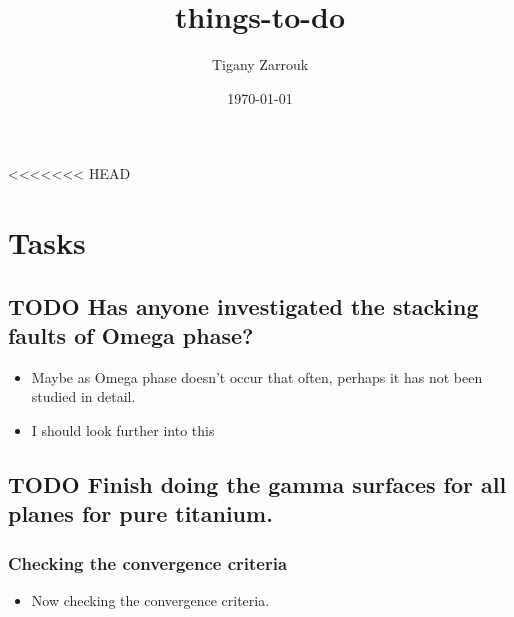 \documentclass[11pt]{article}
\author{Tigany Zarrouk}
\date{\today}
\title{things-to-do}
\begin{document}
\maketitle
\tableofcontents

<<<<<<< HEAD




\section{Tasks}
\label{sec:orga219a3f}

\subsection{{\bfseries\sffamily TODO} Has anyone investigated the stacking faults of Omega phase?}
\label{sec:org435cb98}
\begin{itemize}
\item Maybe as Omega phase doesn't occur that often, perhaps it has not been
studied in detail.
\item I should look further into this
\end{itemize}
\subsection{{\bfseries\sffamily TODO} Finish doing the gamma surfaces for all planes for pure titanium.}
\label{sec:org8de5fdf}
\subsubsection{Checking the convergence criteria}
\label{sec:orgbb149e3}
\begin{itemize}
\item Now checking the convergence criteria.
\end{itemize}
\end{document}
